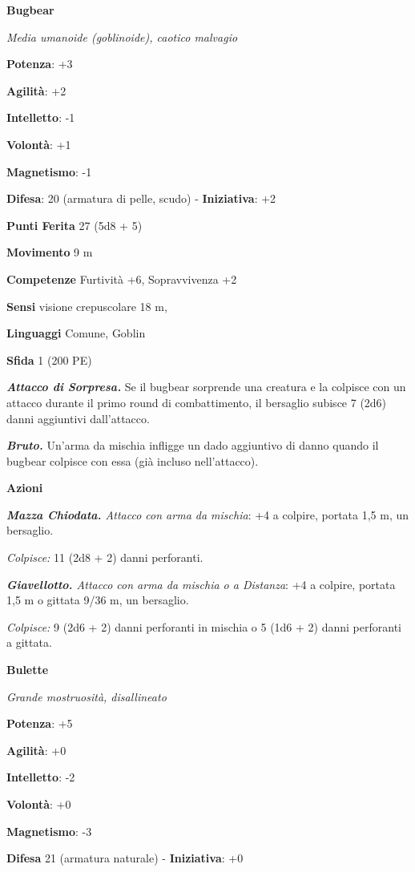 \begin{multicols}{2}
\textbf{Bugbear}

\emph{Media umanoide (goblinoide), caotico malvagio}

\textbf{Potenza}: +3

\textbf{Agilità}: +2

\textbf{Intelletto}: -1

\textbf{Volontà}: +1

\textbf{Magnetismo}: -1

\textbf{Difesa}: 20 (armatura di pelle, scudo) - \textbf{Iniziativa}: +2

\textbf{Punti Ferita} 27 (5d8 + 5)

\textbf{Movimento} 9 m

\textbf{Competenze} Furtività +6, Sopravvivenza +2

\textbf{Sensi} visione crepuscolare 18 m, 

\textbf{Linguaggi} Comune, Goblin

\textbf{Sfida} 1 (200 PE)

\emph{\textbf{Attacco di Sorpresa.}} Se il bugbear sorprende una
creatura e la colpisce con un attacco durante il primo round di
combattimento, il bersaglio subisce 7 (2d6) danni aggiuntivi
dall'attacco.

\emph{\textbf{Bruto.}} Un'arma da mischia infligge un dado aggiuntivo di
danno quando il bugbear colpisce con essa (già incluso nell'attacco).

\textbf{Azioni}

\emph{\textbf{Mazza Chiodata.} Attacco con arma da mischia}: +4 a
colpire, portata 1,5 m, un bersaglio.

\emph{Colpisce:} 11 (2d8 + 2) danni perforanti.

\emph{\textbf{Giavellotto.} Attacco con arma da mischia o a Distanza}:
+4 a colpire, portata 1,5 m o gittata 9/36 m, un bersaglio.

\emph{Colpisce:} 9 (2d6 + 2) danni perforanti in mischia o 5 (1d6 + 2)
danni perforanti a gittata.

\textbf{Bulette}

\emph{Grande mostruosità, disallineato}

\textbf{Potenza}: +5

\textbf{Agilità}: +0

\textbf{Intelletto}: -2

\textbf{Volontà}: +0

\textbf{Magnetismo}: -3

\textbf{Difesa} 21 (armatura naturale) - \textbf{Iniziativa}: +0


\end{multicols}
